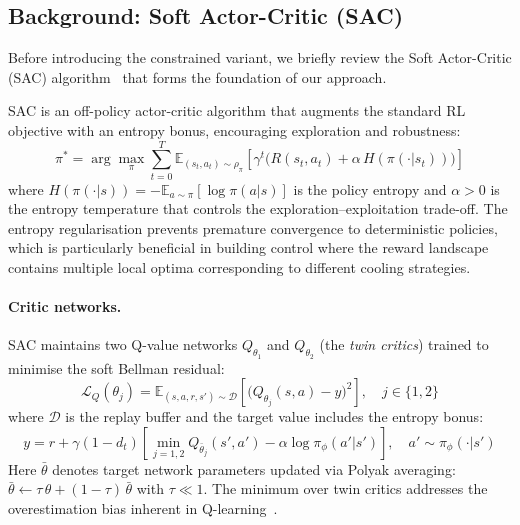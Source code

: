 \subsection{Background: Soft Actor-Critic (SAC)}
\label{sec:temp-sac-background}

Before introducing the constrained variant, we briefly review the Soft
Actor-Critic (SAC) algorithm~\cite{haarnoja2018sac} that forms the
foundation of our approach.

SAC is an off-policy actor-critic algorithm that augments the standard RL
objective with an entropy bonus, encouraging exploration and robustness:
\begin{equation}
  \pi^* = \arg\max_\pi \sum_{t=0}^{T}
    \mathbb{E}_{(s_t, a_t) \sim \rho_\pi}\!\left[
      \gamma^t \bigl(R(s_t, a_t) + \alpha\, H(\pi(\cdot|s_t))\bigr)
    \right]
  \label{eq:sac-objective}
\end{equation}
where $H(\pi(\cdot|s)) = -\mathbb{E}_{a \sim \pi}[\log \pi(a|s)]$ is the
policy entropy and $\alpha > 0$ is the entropy temperature that controls the
exploration--exploitation trade-off.  The entropy regularisation prevents
premature convergence to deterministic policies, which is particularly
beneficial in building control where the reward landscape contains multiple
local optima corresponding to different cooling strategies.

\paragraph{Critic networks.}
SAC maintains two Q-value networks $Q_{\theta_1}$ and $Q_{\theta_2}$ (the
\emph{twin critics}) trained to minimise the soft Bellman residual:
\begin{equation}
  \mathcal{L}_Q(\theta_j) = \mathbb{E}_{(s,a,r,s') \sim \mathcal{D}}\!\left[
    \bigl(Q_{\theta_j}(s,a) - y\bigr)^2
  \right], \quad j \in \{1, 2\}
  \label{eq:sac-critic-loss}
\end{equation}
where $\mathcal{D}$ is the replay buffer and the target value includes the
entropy bonus:
\begin{equation}
  y = r + \gamma(1 - d_t)\!\left[
    \min_{j=1,2} Q_{\bar{\theta}_j}(s', a')
    - \alpha \log \pi_\phi(a'|s')
  \right], \quad a' \sim \pi_\phi(\cdot|s')
  \label{eq:sac-target}
\end{equation}
Here $\bar{\theta}$ denotes target network parameters updated via Polyak
averaging: $\bar{\theta} \leftarrow \tau\,\theta + (1-\tau)\,\bar{\theta}$
with $\tau \ll 1$.  The minimum over twin critics addresses the overestimation
bias inherent in Q-learning~\cite{fujimoto2018td3}.

